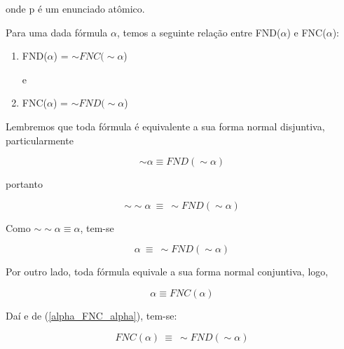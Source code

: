 \noindent onde p é um enunciado atômico.

Para uma dada fórmula $\alpha$, temos a seguinte relação entre FND($\alpha$) e FNC($\alpha$):

\begin{enumerate}[label=\roman*)]
    \item FND($\alpha$) = $\sim FNC(\sim \alpha$)

    e

    \item FNC($\alpha$) = $\sim FND(\sim \alpha$)
\end{enumerate}

Lembremos que toda fórmula é equivalente a sua forma normal disjuntiva, particularmente

$$\sim \alpha \equiv FND(\sim \alpha)$$

portanto

$$\sim \sim \alpha\ \equiv\ \sim FND(\sim \alpha)$$

Como $\sim \sim \alpha \equiv \alpha$, tem-se

\begin{equation}\label{alpha_FNC_alpha}
    \alpha\ \equiv\ \sim FND(\sim \alpha) \tag{1}
\end{equation}

Por outro lado, toda fórmula equivale a sua forma normal conjuntiva, logo,

\begin{equation*}
    \alpha \equiv FNC(\alpha)
\end{equation*}

Daí e de (\ref{alpha_FNC_alpha}), tem-se:

\begin{equation*}
    FNC(\alpha)\ \equiv\ \sim FND(\sim \alpha)
\end{equation*}
